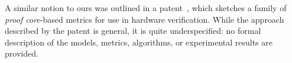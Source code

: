 %
A similar notion to ours was outlined in a patent~\cite{hanna2015formal}, which sketches a family of {\em proof core}-based metrics for use in hardware verification.  While the approach described by the patent is general, it is quite underspecified:
no formal description of the models, metrics, algorithms, or experimental results are provided.%



